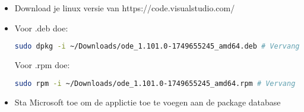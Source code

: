 \begin{itemize}
\item Download je linux versie van https://code.visualstudio.com/
\item Voor .deb doe:
\begin{lstlisting}[language=bash]
sudo dpkg -i ~/Downloads/ode_1.101.0-1749655245_amd64.deb # Vervang het versienummer met jouw versie
\end{lstlisting}
Voor .rpm doe:
\begin{lstlisting}[language=bash]
sudo rpm -i ~/Downloads/ode_1.101.0-1749655245_amd64.rpm # Vervang het versienummer met jouw versie
\end{lstlisting}
\item Sta Microsoft toe om de applictie toe te voegen aan de package database
\end{itemize}

